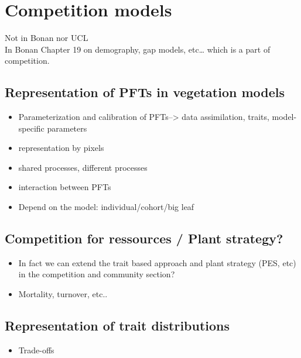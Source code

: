 \documentclass[12pt,oneside]{book}
\providecommand{\tightlist}{%
  \setlength{\itemsep}{0pt}\setlength{\parskip}{0pt}}
\begin{document}
\section{Competition models}\label{competition-models}

Not in Bonan nor UCL\\
In Bonan Chapter 19 on demography, gap models, etc\ldots{} which is a
part of competition.

\subsection{Representation of PFTs in vegetation
models}\label{representation-of-pfts-in-vegetation-models}

\begin{itemize}
\tightlist
\item
  Parameterization and calibration of PFTs--\textgreater{} data
  assimilation, traits, model-specific parameters
\item
  representation by pixels
\item
  shared processes, different processes
\item
  interaction between PFTs
\item
  Depend on the model: individual/cohort/big leaf
\end{itemize}

\subsection{Competition for ressources / Plant
strategy?}\label{competition-for-ressources-plant-strategy}

\begin{itemize}
\tightlist
\item
  In fact we can extend the trait based approach and plant strategy
  (PES, etc) in the competition and community section?
\item
  Mortality, turnover, etc..
\end{itemize}

\subsection{Representation of trait
distributions}\label{representation-of-trait-distributions}

\begin{itemize}
\tightlist
\item
  Trade-offs
\end{itemize}
\end{document}
